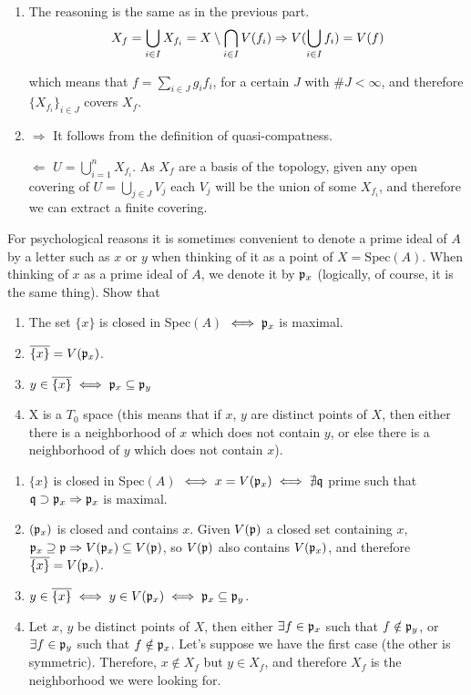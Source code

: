 \begin{sol}
\begin{enumerate}[label=(\roman*)]
		\item The reasoning is the same as in the previous part.
		\[
			X_f = \bigcup_{i \in I} X_{f_i} = X \setminus \bigcap_{i \in I} V(f_i) \Rightarrow V(\bigcup_{i \in I} f_i) = V(f)
		\]
		
		which means that $f = \sum_{i \in J} g_i f_i$, for a certain $J$ with $\#J < \infty$, and therefore $\{ X_{f_i} \}_{i \in J}$ covers $X_f$.

		\item $\boxed{\Rightarrow}$ It follows from the definition of quasi-compatness.

		\noindent $\boxed{\Leftarrow}$ $U = \bigcup_{i = 1}^n X_{f_i}$. As $X_f$ are a basis of the topology, given any open covering of $U = \bigcup_{j \in J} V_j$ each $V_j$ will be the union of some $X_{f_i}$, and therefore we can extract a finite covering.
	\end{enumerate}
\end{sol}


\begin{ex}
For psychological reasons it is sometimes convenient to denote a prime ideal of $A$ by a letter such as $x$ or $y$ when thinking of it as a point of $X = \text{Spec}(A)$. When thinking of $x$ as a prime ideal of $A$, we denote it by $\mathfrak{p}_x$ (logically, of course,
it is the same thing). Show that
	\begin{enumerate}[label=(\roman*)]
		\item The set $\{x\}$ is closed in Spec$(A)$ $\iff \mathfrak{p}_x$ is maximal.
		\item $\overline{\{x\}} = V(\mathfrak{p}_x)$.
		\item $y \in \overline{\{x\}} \iff \mathfrak{p}_x \subseteq \mathfrak{p}_y$
		\item X is a $T_0$ space (this means that if $x$, $y$ are distinct points of $X$, then either there is a neighborhood of $x$ which does not contain $y$, or else there is a neighborhood of $y$ which does not contain $x$).
	\end{enumerate}
\end{ex}

\begin{sol}
	\begin{enumerate}[label=(\roman*)]
		\item $\{x\}$ is closed in Spec$(A)$ $\iff x = V(\mathfrak{p}_x) \iff \nexists \mathfrak{q}$ prime such that $\mathfrak{q} \supset \mathfrak{p}_x \Rightarrow \mathfrak{p}_x$ is maximal.  
		\item $(\mathfrak{p}_x)$ is closed and contains $x$. Given $V(\mathfrak{p})$ a closed set containing $x$, $\mathfrak{p}_x \supseteq \mathfrak{p} \Rightarrow V(\mathfrak{p}_x) \subseteq V(\mathfrak{p})$, so $V(\mathfrak{p})$ also contains $V(\mathfrak{p}_x)$, and therefore $\overline{\{x\}} = V(\mathfrak{p}_x)$.
		\item $y \in \overline{\{x\}} \iff y \in V(\mathfrak{p}_x) \iff \mathfrak{p}_x \subseteq \mathfrak{p}_y$.
		\item Let $x$, $y$ be distinct points of $X$, then either $\exists f \in \mathfrak{p}_x$ such that $f \notin \mathfrak{p}_y$, or $\exists f \in \mathfrak{p}_y$ such that $f \notin \mathfrak{p}_x$. Let's suppose we have the first case (the other is symmetric). Therefore, $x \notin X_f$ but $y \in X_f$, and therefore $X_f$ is the neighborhood we were looking for. 
	\end{enumerate}
\end{sol}

